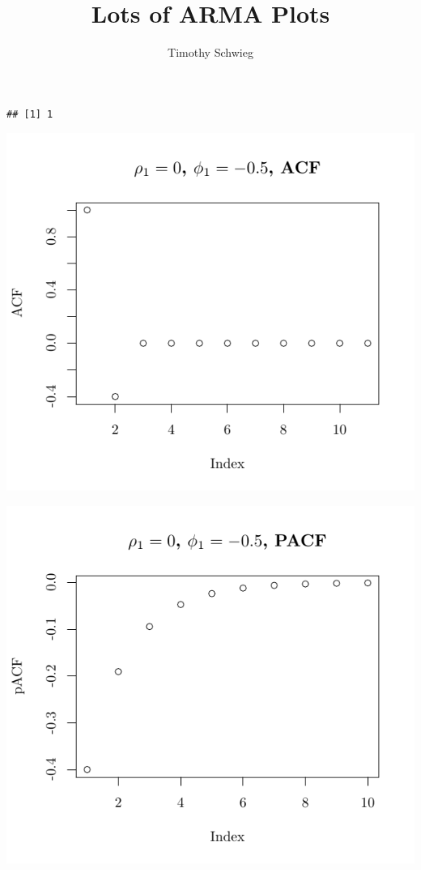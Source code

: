 \documentclass[10pt]{paper}\usepackage[]{graphicx}\usepackage[]{color}
\title{Lots of ARMA Plots}
\author{Timothy Schwieg}
\makeatletter
\def\maxwidth{ %
  \ifdim\Gin@nat@width>\linewidth
    \linewidth
  \else
    \Gin@nat@width
  \fi
}
\newenvironment{kframe}{%
 \def\at@end@of@kframe{}%
 \ifinner\ifhmode%
  \def\at@end@of@kframe{\end{minipage}}%
  \begin{minipage}{\columnwidth}%
 \fi\fi%
 \def\FrameCommand##1{\hskip\@totalleftmargin \hskip-\fboxsep
 \colorbox{shadecolor}{##1}\hskip-\fboxsep
     \hskip-\linewidth \hskip-\@totalleftmargin \hskip\columnwidth}%
 \MakeFramed {\advance\hsize-\width
   \@totalleftmargin\z@ \linewidth\hsize
   \@setminipage}}%
 {\par\unskip\endMakeFramed%
 \at@end@of@kframe}
\newenvironment{knitrout}{}{} %
\makeatother
\begin{document}
\begin{knitrout}
\color{fgcolor}\begin{kframe}
\begin{verbatim}
## [1] 1
\end{verbatim}
\end{kframe}

{\centering \includegraphics[width=\maxwidth]{figure/graphics-plotter-1} 

}




{\centering \includegraphics[width=\maxwidth]{figure/graphics-plotter-2} 

}
\end{knitrout}
\end{document}
